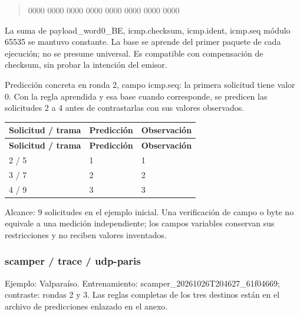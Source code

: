 \begin{quote}\ttfamily\footnotesize\raggedright 0000 0000 0000 0000 0000 0000 0000 0000\end{quote}
La suma de payload\_\allowbreak{}word0\_\allowbreak{}BE, icmp.checksum, icmp.ident, icmp.seq módulo 65535 se mantuvo constante. La base se aprende del primer paquete de cada ejecución; no se presume universal. Es compatible con compensación de checksum, sin probar la intención del emisor.

Predicción concreta en ronda 2, campo icmp.seq: la primera solicitud tiene valor 0. Con la regla aprendida y esa base cuando corresponde, se predicen las solicitudes 2 a 4 antes de contrastarlas con sus valores observados.

\begingroup
\fontsize{9}{11}\selectfont
\addtocounter{table}{-1}
\begin{longtable}{p{3.2cm}p{5.1cm}p{5.1cm}}
\toprule
\textbf{Solicitud / trama} & \textbf{Predicción} & \textbf{Observación} \\ \midrule
\endfirsthead
\toprule
\textbf{Solicitud / trama} & \textbf{Predicción} & \textbf{Observación} \\ \midrule
\endhead
2 / 5 & 1 & 1 \\
3 / 7 & 2 & 2 \\
4 / 9 & 3 & 3 \\
\bottomrule
\end{longtable}
\endgroup
Alcance: 9 solicitudes en el ejemplo inicial. Una verificación de campo o byte no equivale a una medición independiente; los campos variables conservan sus restricciones y no reciben valores inventados.

\subsubsection{scamper / trace / udp-paris}
Ejemplo: Valparaíso. Entrenamiento: scamper\_\allowbreak{}20261026T204627\_\allowbreak{}61f04669; contraste: rondas 2 y 3. Las reglas completas de los tres destinos están en el archivo de predicciones enlazado en el anexo.

